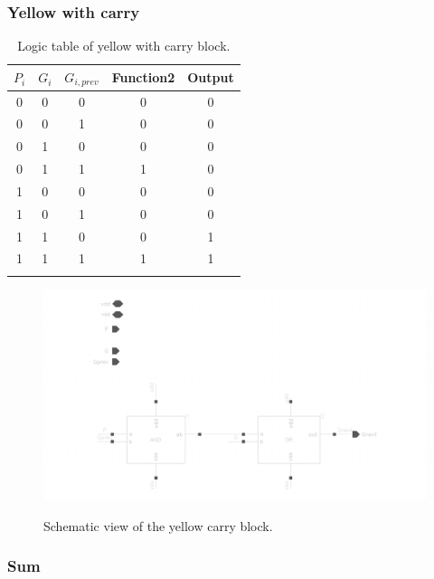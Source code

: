 \subsubsection{Yellow with carry}

\begin{table}[H]
  \caption{Logic table of yellow with carry block.}
  \centering
  \begin{tabular}{ccc|cc}
    \toprule
    $P_i$ & $G_i$ & $G_{i,prev}$ & Function2 & Output \\
    \midrule
    0 & 0 & 0 & 0 & 0 \\
    0 & 0 & 1 & 0 & 0 \\
    0 & 1 & 0 & 0 & 0 \\
    0 & 1 & 1 & 1 & 0 \\
    1 & 0 & 0 & 0 & 0 \\
    1 & 0 & 1 & 0 & 0 \\
    1 & 1 & 0 & 0 & 1 \\
    1 & 1 & 1 & 1 & 1 \\
    \bottomrule
    \label{tab:yellowcarry}
  \end{tabular}
\end{table}

\begin{figure}[H]
  \centering
  \captionsetup{justification=centering}
  {\includegraphics[width=1.2\textwidth]{../figures/yellow_carry}}
  \caption{Schematic view of the yellow carry block.} \label{fig:yellow_c}
\end{figure}

\subsubsection{Sum}

